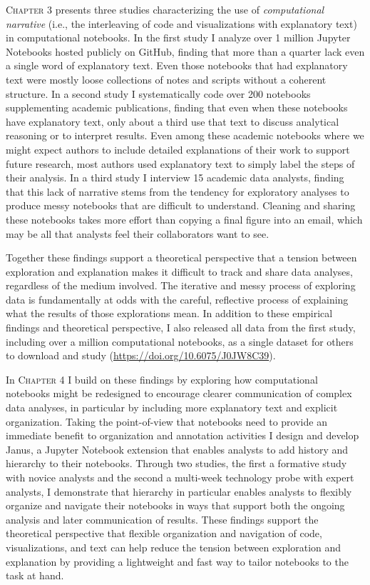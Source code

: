 \textsc{Chapter 3} presents three studies characterizing the use of \emph{computational narrative} (i.e., the interleaving of code and visualizations with explanatory text) in computational notebooks. In the first study I analyze over 1 million Jupyter Notebooks hosted publicly on GitHub, finding that more than a quarter lack even a single word of explanatory text. Even those notebooks that had explanatory text were mostly loose collections of notes and scripts without a coherent structure. In a second study I systematically code over 200 notebooks supplementing academic publications, finding that even when these notebooks have explanatory text, only about a third use that text to discuss analytical reasoning or to interpret results. Even among these academic notebooks where we might expect authors to include detailed explanations of their work to support future research, most authors used explanatory text to simply label the steps of their analysis. In a third study I interview 15 academic data analysts, finding that this lack of narrative stems from the tendency for exploratory analyses to produce messy notebooks that are difficult to understand. Cleaning and sharing these notebooks takes more effort than copying a final figure into an email, which may be all that analysts feel their collaborators want to see.

Together these findings support a theoretical perspective that a tension between exploration and explanation makes it difficult to track and share data analyses, regardless of the medium involved. The iterative and messy process of exploring data is fundamentally at odds with the careful, reflective process of explaining what the results of those explorations mean. In addition to these empirical findings and theoretical perspective, I also released all data from the first study, including over a million computational notebooks, as a single dataset for others to download and study (\url{https://doi.org/10.6075/J0JW8C39}).

In \textsc{Chapter 4} I build on these findings by exploring how computational notebooks might be redesigned to encourage clearer communication of complex data analyses, in particular by including more explanatory text and explicit organization. Taking the point-of-view that notebooks need to provide an immediate benefit to organization and annotation activities I design and develop Janus, a Jupyter Notebook extension that enables analysts to add history and hierarchy to their notebooks. Through two studies, the first a formative study with novice analysts and the second a multi-week technology probe with expert analysts, I demonstrate that hierarchy in particular enables analysts to flexibly organize and navigate their notebooks in ways that support both the ongoing analysis and later communication of results. These findings support the theoretical perspective that flexible organization and navigation of code, visualizations, and text can help reduce the tension between exploration and explanation by providing a lightweight and fast way to tailor notebooks to the task at hand.

